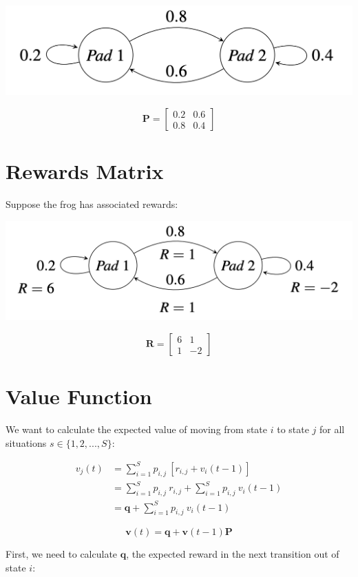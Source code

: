 \documentclass[
  letterpaper,
  DIV=11,
  numbers=noendperiod]{scrreprt}
\begin{document}
\includegraphics[width=0.5\linewidth,height=\textheight,keepaspectratio]{lecture4/images/markovchain-ex-prob.png}

\[
\mathbf{P} = \begin{bmatrix} 0.2 & 0.6 \\ 0.8 & 0.4 \end{bmatrix}
\]

\section{Rewards Matrix}\label{rewards-matrix}

Suppose the frog has associated rewards:

\includegraphics[width=0.5\linewidth,height=\textheight,keepaspectratio]{lecture4/images/markovchain-ex-prob-rew.png}

\[
\mathbf{R} = \begin{bmatrix} 6 & 1 \\ 1 & -2 \end{bmatrix}
\]

\section{Value Function}\label{value-function}

We want to calculate the expected value of moving from state \(i\) to
state \(j\) for all situations \(s \in \{1,2,...,S\}\):

\[
\begin{align*}
v_{j}(t) & = \sum_{i=1}^{S} p_{i,j} \ [r_{i,j}+v_{i}(t-1)] \\
& = \sum_{i=1}^{S} p_{i,j} \ r_{i,j} + \sum_{i=1}^{S} p_{i,j} \ v_{i}(t-1) \\ 
& = \textbf{q} + \sum_{i=1}^{S} p_{i,j}\ v_{i}(t-1)
\end{align*}
\]

\[
\mathbf{v}(t) = \mathbf{q} + \mathbf{v}(t-1) \mathbf{P}
\]

First, we need to calculate \(\textbf{q}\), the expected reward in the
next transition out of state \(i\):
\end{document}
